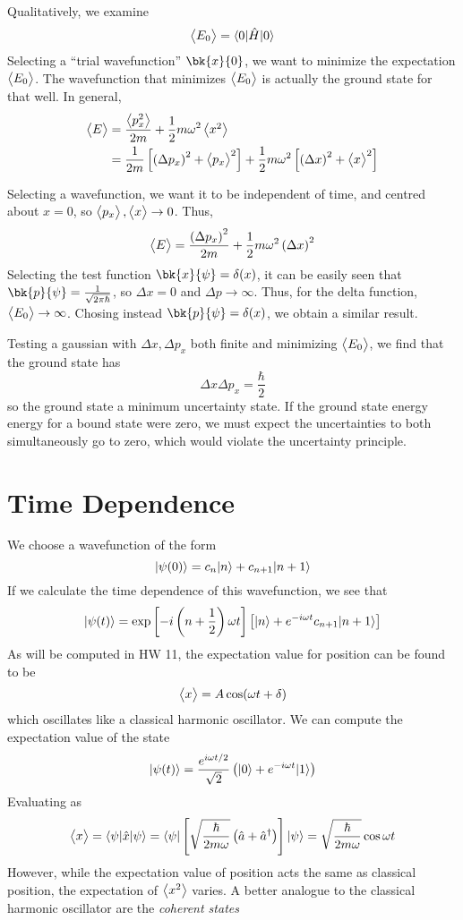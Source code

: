 Qualitatively, we examine
\[\left\langle \begin{matrix}E_0\end{matrix} \right\rangle=\langle0\rvert\hat H\lvert0\rangle\]
Selecting a ``trial wavefunction'' \(\bk{x}{0}\), we want to minimize the expectation \(\left\langle \begin{matrix}E_0\end{matrix} \right\rangle\). The wavefunction that minimizes \(\left\langle \begin{matrix}E_0\end{matrix} \right\rangle\) is actually the ground state for that well. In general,
\begin{subequations}
	\begin{align}
		\left\langle \begin{matrix}E\end{matrix} \right\rangle &= \frac{\left\langle \begin{matrix}p_x^2\end{matrix} \right\rangle}{2m}+\frac{1}{2}m\omega^2\left\langle \begin{matrix}x^2\end{matrix} \right\rangle\\
			 &= \frac{1}{2m}\left[\left(\Delta p_x\right)^2+\left\langle \begin{matrix}p_x\end{matrix} \right\rangle^2\right]+\frac{1}{2}m\omega^2\left[\left(\Delta x\right)^2+\left\langle \begin{matrix}x\end{matrix} \right\rangle^2\right]
	\end{align}
\end{subequations}

Selecting a wavefunction, we want it to be independent of time, and centred about \(x=0\), so \(\left\langle \begin{matrix}p_x\end{matrix} \right\rangle,\left\langle \begin{matrix}x\end{matrix} \right\rangle\rightarrow0\). Thus,
\[\left\langle \begin{matrix}E\end{matrix} \right\rangle = \frac{\left(\Delta p_x\right)^2}{2m}+\frac{1}{2}m\omega^2\left(\Delta x\right)^2\]
Selecting the test function \(\bk{x}{\p}=\delta(x)\), it can be easily seen that \(\bk{p}{\p}=\frac{1}{\sqrt{2\pi\hbar}}\), so \(\Delta x = 0\) and \(\Delta p \to \infty\). Thus, for the delta function, \(\left\langle \begin{matrix}E_0\end{matrix} \right\rangle\rightarrow\infty\). Chosing instead \(\bk{p}{\p}=\delta(x)\), we obtain a similar result.

Testing a gaussian with \(\Delta x,\Delta p_x\) both finite and minimizing \(\left\langle \begin{matrix}E_0\end{matrix} \right\rangle\), we find that the ground state has
\[\Delta x \Delta p_x = \frac{\hbar}{2}\]
so the ground state a minimum uncertainty state. If the ground state energy energy for a bound state were zero, we must expect the uncertainties to both simultaneously go to zero, which would violate the uncertainty principle.

\section{Time Dependence}
We choose a wavefunction of the form
\[\lvert\psi(0)\rangle = c_n\lvert n\rangle+c_{n+1}\lvert n+1\rangle\]
If we calculate the time dependence of this wavefunction, we see that
\[\lvert\psi(t)\rangle = \exp\left[-i\left(n+\frac{1}{2}\right)\omega t\right]\left[\lvert n\rangle+e^{-i\omega t}c_{n+1}\lvert n+1\rangle\right]\]
As will be computed in HW 11, the expectation value for position can be found to be
\begin{equation}
	\left\langle \begin{matrix}x\end{matrix} \right\rangle = A\cos(\omega t + \delta)
\end{equation}
which oscillates like a classical harmonic oscillator. We can compute the expectation value of the state
\[\lvert\psi(t)\rangle = \frac{e^{i\omega t/2}}{\sqrt{2}}\left(\lvert0\rangle+e^{-i\omega t}\lvert1\rangle\right)\]
Evaluating as
\[\left\langle \begin{matrix}x\end{matrix} \right\rangle = \langle\psi\rvert \hat x \lvert\psi\rangle = \langle\psi\rvert \left[\sqrt{\frac{\hbar}{2m\omega}}\left(\hat a + \hat a ^{\dagger}\right)\right]\lvert\psi\rangle = \sqrt{\frac{\hbar}{2m\omega}}\cos\omega t\]
However, while the expectation value of position acts the same as classical position, the expectation of \(\left\langle \begin{matrix}x^2\end{matrix} \right\rangle\) varies. A better analogue to the classical harmonic oscillator are the \emph{coherent states}

